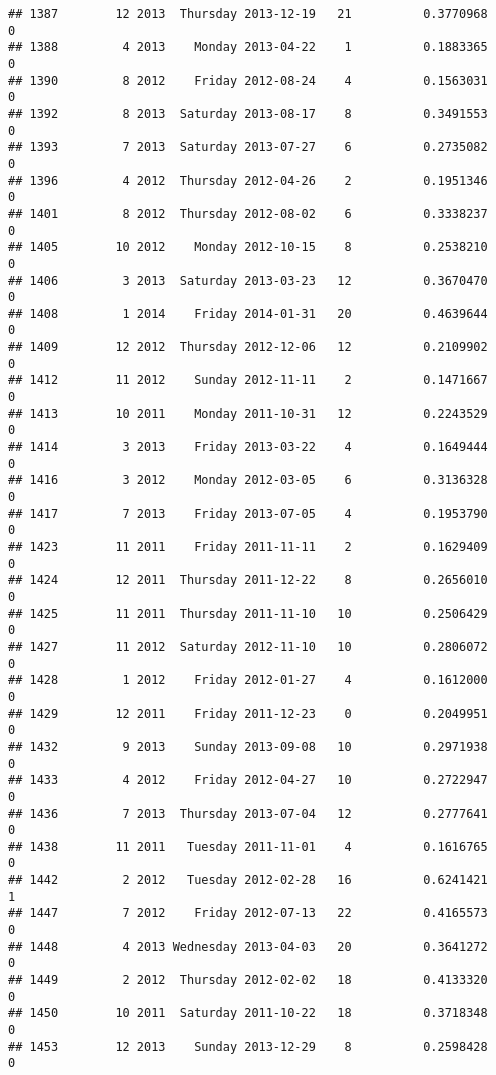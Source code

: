 \documentclass[
]{article}
\begin{document}
\begin{verbatim}
## 1387        12 2013  Thursday 2013-12-19   21          0.3770968             0
## 1388         4 2013    Monday 2013-04-22    1          0.1883365             0
## 1390         8 2012    Friday 2012-08-24    4          0.1563031             0
## 1392         8 2013  Saturday 2013-08-17    8          0.3491553             0
## 1393         7 2013  Saturday 2013-07-27    6          0.2735082             0
## 1396         4 2012  Thursday 2012-04-26    2          0.1951346             0
## 1401         8 2012  Thursday 2012-08-02    6          0.3338237             0
## 1405        10 2012    Monday 2012-10-15    8          0.2538210             0
## 1406         3 2013  Saturday 2013-03-23   12          0.3670470             0
## 1408         1 2014    Friday 2014-01-31   20          0.4639644             0
## 1409        12 2012  Thursday 2012-12-06   12          0.2109902             0
## 1412        11 2012    Sunday 2012-11-11    2          0.1471667             0
## 1413        10 2011    Monday 2011-10-31   12          0.2243529             0
## 1414         3 2013    Friday 2013-03-22    4          0.1649444             0
## 1416         3 2012    Monday 2012-03-05    6          0.3136328             0
## 1417         7 2013    Friday 2013-07-05    4          0.1953790             0
## 1423        11 2011    Friday 2011-11-11    2          0.1629409             0
## 1424        12 2011  Thursday 2011-12-22    8          0.2656010             0
## 1425        11 2011  Thursday 2011-11-10   10          0.2506429             0
## 1427        11 2012  Saturday 2012-11-10   10          0.2806072             0
## 1428         1 2012    Friday 2012-01-27    4          0.1612000             0
## 1429        12 2011    Friday 2011-12-23    0          0.2049951             0
## 1432         9 2013    Sunday 2013-09-08   10          0.2971938             0
## 1433         4 2012    Friday 2012-04-27   10          0.2722947             0
## 1436         7 2013  Thursday 2013-07-04   12          0.2777641             0
## 1438        11 2011   Tuesday 2011-11-01    4          0.1616765             0
## 1442         2 2012   Tuesday 2012-02-28   16          0.6241421             1
## 1447         7 2012    Friday 2012-07-13   22          0.4165573             0
## 1448         4 2013 Wednesday 2013-04-03   20          0.3641272             0
## 1449         2 2012  Thursday 2012-02-02   18          0.4133320             0
## 1450        10 2011  Saturday 2011-10-22   18          0.3718348             0
## 1453        12 2013    Sunday 2013-12-29    8          0.2598428             0

\end{verbatim}
\end{document}
